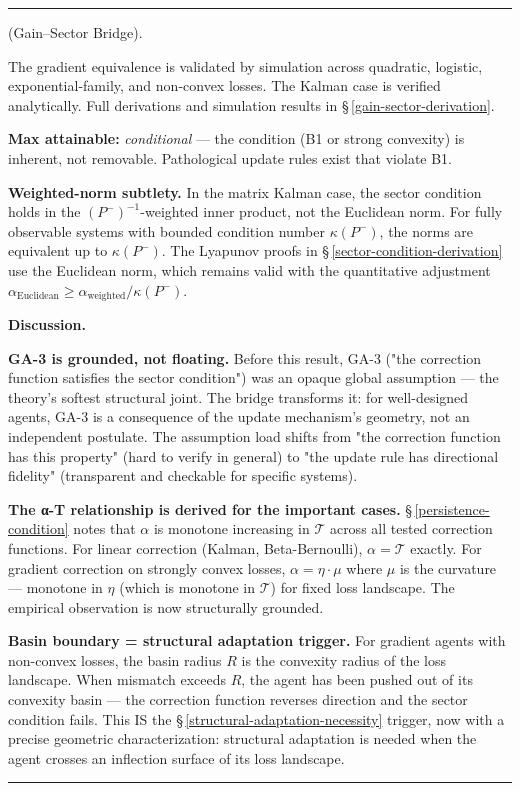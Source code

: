 \documentclass[11pt,oneside]{article}
\newcounter{claim}[section]
\renewcommand{\theclaim}{\thesection.\arabic{claim}}
\newenvironment{segment}[2]{%
  \refstepcounter{claim}%
  \bigskip\noindent\hrule\smallskip
  \noindent{\bfseries #1~\theclaim}\enskip(#2).\par\smallskip
  \noindent\ignorespaces
}{%
  \par\smallskip\noindent\hrule\bigskip
}
\newenvironment{proposition}[1][]{\begin{segment}{Proposition}{#1}}{\end{segment}}
\begin{document}
\begin{proposition}[Gain–Sector Bridge]
The gradient equivalence is validated by simulation across quadratic, logistic, exponential-family, and non-convex losses. The Kalman case is verified analytically. Full derivations and simulation results in \S\,\ref{gain-sector-derivation}.

\textbf{Max attainable:} \textit{conditional} — the condition (B1 or strong convexity) is inherent, not removable. Pathological update rules exist that violate B1.

\textbf{Weighted-norm subtlety.} In the matrix Kalman case, the sector condition holds in the $(P^-)^{-1}$-weighted inner product, not the Euclidean norm. For fully observable systems with bounded condition number $\kappa(P^-)$, the norms are equivalent up to $\kappa(P^-)$. The Lyapunov proofs in \S\,\ref{sector-condition-derivation} use the Euclidean norm, which remains valid with the quantitative adjustment $\alpha_{\text{Euclidean}} \geq \alpha_{\text{weighted}} / \kappa(P^-)$.


\medskip\noindent\textbf{Discussion.}


\textbf{GA-3 is grounded, not floating.} Before this result, GA-3 ("the correction function satisfies the sector condition") was an opaque global assumption — the theory's softest structural joint. The bridge transforms it: for well-designed agents, GA-3 is a consequence of the update mechanism's geometry, not an independent postulate. The assumption load shifts from "the correction function has this property" (hard to verify in general) to "the update rule has directional fidelity" (transparent and checkable for specific systems).

\textbf{The α-T relationship is derived for the important cases.} \S\,\ref{persistence-condition} notes that $\alpha$ is monotone increasing in $\mathcal{T}$ across all tested correction functions. For linear correction (Kalman, Beta-Bernoulli), $\alpha = \mathcal{T}$ exactly. For gradient correction on strongly convex losses, $\alpha = \eta \cdot \mu$ where $\mu$ is the curvature — monotone in $\eta$ (which is monotone in $\mathcal{T}$) for fixed loss landscape. The empirical observation is now structurally grounded.

\textbf{Basin boundary = structural adaptation trigger.} For gradient agents with non-convex losses, the basin radius $R$ is the convexity radius of the loss landscape. When mismatch exceeds $R$, the agent has been pushed out of its convexity basin — the correction function reverses direction and the sector condition fails. This IS the \S\,\ref{structural-adaptation-necessity} trigger, now with a precise geometric characterization: structural adaptation is needed when the agent crosses an inflection surface of its loss landscape.


\end{proposition}
\end{document}
